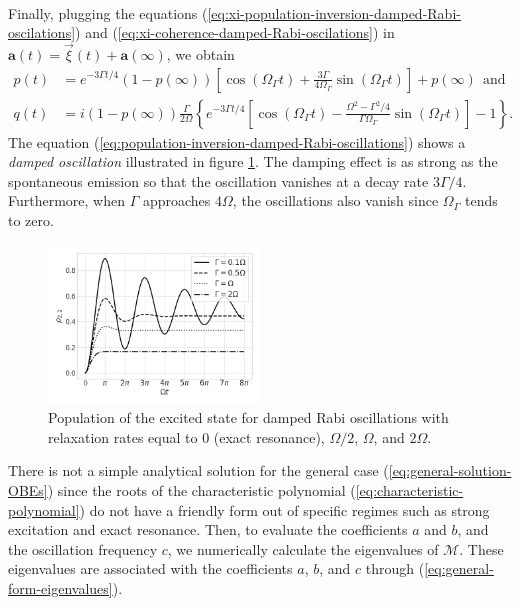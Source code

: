 {\begin{align}
	\label{eq:xi-coherence-damped-Rabi-oscilations}
\end{align}
Finally, plugging the equations (\ref{eq:xi-population-inversion-damped-Rabi-oscilations}) and (\ref{eq:xi-coherence-damped-Rabi-oscilations}) in $ \mathbf{a}(t) = \vec{\xi}(t) + \mathbf{a}(\infty) $, we obtain
\begin{align}
	p(t) &= e^{-3\Gamma t / 4}(1 - p(\infty))\left[\cos(\Omega_{\Gamma}t) + \frac{3\Gamma}{4 \Omega_{\Gamma}} \sin(\Omega_{\Gamma}t) \right] + p(\infty)\ \ \textrm{and}
	\label{eq:population-inversion-damped-Rabi-oscillations}
	\\
	q(t) &= i(1 - p(\infty)) \frac{\Gamma}{2\Omega} \left\{ e^{-3\Gamma t / 4} \left[\cos(\Omega_{\Gamma}t) - \frac{\Omega^2 - \Gamma^2 / 4}{\Gamma \Omega_{\Gamma}} \sin(\Omega_{\Gamma}t) \right] - 1 \right\}.
	\label{eq:coherence-damped-Rabi-oscillations}
\end{align}
The equation (\ref{eq:population-inversion-damped-Rabi-oscillations}) shows a \textit{damped oscillation} illustrated in figure \ref{fig:damped-Rabi-oscillations}. The damping effect is as strong as the spontaneous emission so that the oscillation vanishes at a decay rate $ 3\Gamma/4 $. Furthermore, when $ \Gamma $ approaches $ 4\Omega $, the oscillations also vanish since $ \Omega_{\Gamma} $ tends to zero.

\begin{figure}[!ht]
	\centering
	\vspace{-10pt}
	\includegraphics[width=0.5\textwidth]{USPSC-img/Damped_Rabi_oscillations.png}
	\caption{Population of the excited state for damped Rabi oscillations with relaxation rates equal to $ 0 $ (exact resonance), $ \Omega/2 $, $ \Omega $, and $ 2\Omega $.}
	\label{fig:damped-Rabi-oscillations}
\end{figure}

There is not a simple analytical solution for the general case (\ref{eq:general-solution-OBEs}) since the roots of the characteristic polynomial (\ref{eq:characteristic-polynomial}) do not have a friendly form out of specific regimes such as strong excitation and exact resonance. Then, to evaluate the coefficients $ a $ and $ b $, and the oscillation frequency $ c $, we numerically calculate the eigenvalues of $ \mathcal{M} $. These eigenvalues are associated with the coefficients $ a $, $ b $, and $ c $ through (\ref{eq:general-form-eigenvalues}).

}
